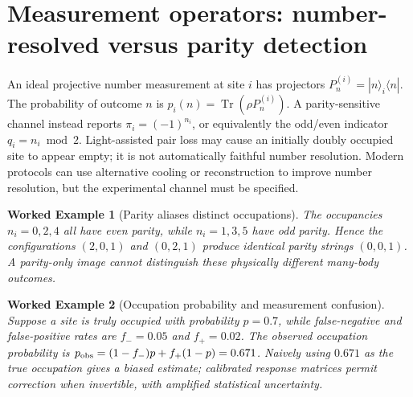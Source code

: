 \documentclass[11pt,a4paper]{article}
\newtheorem{example}{Worked Example}
\newcommand{\tr}{\operatorname{Tr}}
\begin{document}
\section{Measurement operators: number-resolved versus parity detection}
An ideal projective number measurement at site $i$ has projectors $P_{n}^{(i)}=|n\rangle_i\langle n|$. The probability of outcome $n$ is $p_i(n)=\tr(\rho P_n^{(i)})$. A parity-sensitive channel instead reports $\pi_i=(-1)^{n_i}$, or equivalently the odd/even indicator $q_i=n_i\bmod2$. Light-assisted pair loss may cause an initially doubly occupied site to appear empty; it is not automatically faithful number resolution. Modern protocols can use alternative cooling or reconstruction to improve number resolution, but the experimental channel must be specified.
\begin{example}[Parity aliases distinct occupations]
The occupancies $n_i=0,2,4$ all have even parity, while $n_i=1,3,5$ have odd parity. Hence the configurations $(2,0,1)$ and $(0,2,1)$ produce identical parity strings $(0,0,1)$. A parity-only image cannot distinguish these physically different many-body outcomes.
\end{example}
\begin{example}[Occupation probability and measurement confusion]
Suppose a site is truly occupied with probability $p=0.7$, while false-negative and false-positive rates are $f_-=0.05$ and $f_+=0.02$. The observed occupation probability is $p_{\rm obs}=(1-f_-)p+f_+(1-p)=0.671$. Naively using $0.671$ as the true occupation gives a biased estimate; calibrated response matrices permit correction when invertible, with amplified statistical uncertainty.
\end{example}
\end{document}
